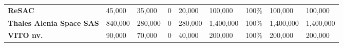 \begin{table}[H]
{\begin{tabular}{p{5cm}p{2cm}p{2cm}p{2.5cm}p{2cm}p{2cm}p{2cm}p{2cm}p{2cm}}
\textbf{ReSAC}                                                                           & 45,000                                                                                                & 35,000                                                                                          &0                                                                                                                & 20,000                                                                                     & 100,000                                                                                                    & 100\%                                                                                                & 100,000                                                                                             & 100,000                                                                                               \\
\textbf{Thales Alenia Space SAS}             & 840,000                                                                                               & 280,000                                                                                         &0                                                                                                                & 280,000                                                                                    & 1,400,000                                                                                                  & 100\%                                                                                                & 1,400,000                                                                                           & 1,400,000                                                                                             \\
\textbf{VITO nv.}                                                                        & 90,000                                                                                                & 70,000                                                                                          &0                                                                                                                & 40,000                                                                                     & 200,000                                                                                                    & 100\%                                                                                                & 200,000                                                                                             & 200,000                                                                                               \\\hline

\end{tabular}}
\end{table}
